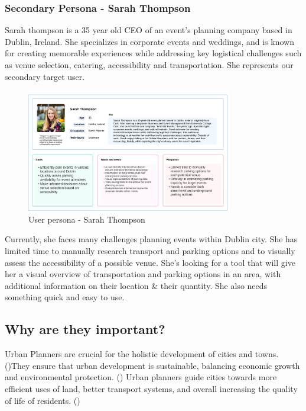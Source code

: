 \subsubsection{Secondary Persona - Sarah Thompson}
Sarah thompson is a 35 year old CEO of an event's planning company based in
Dublin, Ireland. She specializes in corporate events and weddings, and is known
for creating memorable experiences while addressing key logistical challenges
such as venue selection, catering, accessibility and transportation. She
represents our secondary target user.

\begin{figure}[htbp!]
    \centering{}{}
    \includegraphics[width=0.8\textwidth]{images/sarah-thompson-userpersona.png}
    \caption{User persona - Sarah Thompson}
\end{figure}

\newpage{}

Currently, she faces many challenges planning events within Dublin city. She has
limited time to manually research transport and parking options and to visually
assess the accessibility of a possible venue. She's looking for a tool that will
give her a visual overview of transportation and parking options in an area,
with additional information on their location  \& their quantity. She also needs
something quick and easy to use.

\subsection{Why are they important?}
Urban Planners are crucial for the holistic development of cities and towns.
(\cite{jha2021review})They ensure that urban development is sustainable,
balancing economic growth and environmental protection. (\cite{lei2021urban})
Urban planners guide cities towards more efficient uses of land, better
transport systems, and overall increasing the quality of life of residents.
(\cite{janpavle2022importance})

